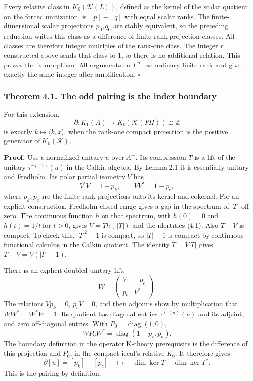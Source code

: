 \documentclass[
  11pt,
]{article}
\begin{document}
Every relative class in \(K_0(\mathcal K(L))\), defined as the kernel of
the scalar quotient on the forced unitization, is \([p]-[q]\) with equal
scalar ranks. The finite-dimensional scalar projections \(p_0,q_0\) are
stably equivalent, so the preceding reduction writes this class as a
difference of finite-rank projection classes. All classes are therefore
integer multiples of the rank-one class. The integer \(r\) constructed
above sends that class to \(1\), so there is no additional relation.
This proves the isomorphism. All arguments on \(L^n\) use ordinary
finite rank and give exactly the same integer after amplification.
\(\square\)

\subsubsection{Theorem 4.1. The odd pairing is the index
boundary}\label{theorem-4.1.-the-odd-pairing-is-the-index-boundary}

For this extension, \[
\partial:K_1(A)\longrightarrow K_0(\mathcal K(PH))\cong\mathbb Z
\] is exactly \(k\mapsto\langle k,x\rangle\), when the rank-one compact
projection is the positive generator of \(K_0(\mathcal K)\).

\textbf{Proof.} Use a normalized unitary \(u\) over \(A^+\). Its
compression \(T\) is a lift of the unitary \(\tau^{+,(n)}(u)\) in the
Calkin algebra. By Lemma 2.1 it is essentially unitary and Fredholm. Its
polar partial isometry \(V\) has \[
V^*V=1-p_k,\qquad VV^*=1-p_c,
\tag{4.1}
\] where \(p_k,p_c\) are the finite-rank projections onto its kernel and
cokernel. For an explicit construction, Fredholm closed range gives a
gap in the spectrum of \(|T|\) off zero. The continuous function \(h\)
on that spectrum, with \(h(0)=0\) and \(h(t)=1/t\) for \(t>0\), gives
\(V=Th(|T|)\) and the identities (4.1). Also \(T-V\) is compact. To
check this, \(|T|^2-1\) is compact, so \(|T|-1\) is compact by
continuous functional calculus in the Calkin quotient. The identity
\(T=V|T|\) gives \(T-V=V(|T|-1)\).

There is an explicit doubled unitary lift: \[
W=\begin{pmatrix}V&-p_c\\p_k&V^*\end{pmatrix}.
\tag{4.2}
\] The relations \(Vp_k=0\), \(p_cV=0\), and their adjoints show by
multiplication that \(WW^*=W^*W=1\). Its quotient has diagonal entries
\(\tau^{+,(n)}(u)\) and its adjoint, and zero off-diagonal entries. With
\(P_0=\operatorname{diag}(1,0)\), \[
WP_0W^*=\operatorname{diag}(1-p_c,p_k).
\tag{4.3}
\] The boundary definition in the operator K-theory prerequisite is the
difference of this projection and \(P_0\), in the compact ideal's
relative \(K_0\). It therefore gives \[
\partial[u]=[p_k]-[p_c]
\quad\longmapsto\quad
\dim\ker T-\dim\ker T^*.
\tag{4.4}
\] This is the pairing by definition.
\end{document}

